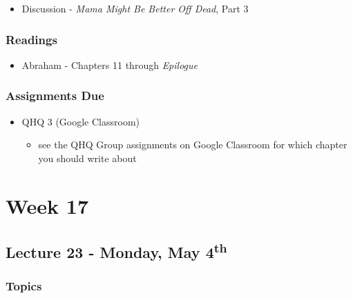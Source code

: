 \documentclass[]{book}
\providecommand{\tightlist}{%
  \setlength{\itemsep}{0pt}\setlength{\parskip}{0pt}}
\begin{document}
\begin{itemize}
\tightlist
\item
  Discussion - \emph{Mama Might Be Better Off Dead}, Part 3
\end{itemize}

\hypertarget{readings-27}{%
\subsubsection*{Readings}\label{readings-27}}

\begin{itemize}
\tightlist
\item
  Abraham - Chapters 11 through \emph{Epilogue}
\end{itemize}

\hypertarget{assignments-due-6}{%
\subsubsection*{Assignments Due}\label{assignments-due-6}}

\begin{itemize}
\tightlist
\item
  QHQ 3 (Google Classroom)

  \begin{itemize}
  \tightlist
  \item
    see the QHQ Group assignments on Google Classroom for which chapter you should write about
  \end{itemize}
\end{itemize}

\newpage

\hypertarget{week-17}{%
\section*{Week 17}\label{week-17}}

\hypertarget{lecture-23---monday-may-4th}{%
\subsection*{\texorpdfstring{Lecture 23 - Monday, May 4\textsuperscript{th}}{Lecture 23 - Monday, May 4th}}\label{lecture-23---monday-may-4th}}

\hypertarget{topics-30}{%
\subsubsection*{Topics}\label{topics-30}}
\end{document}
